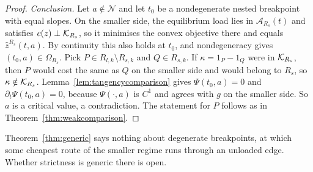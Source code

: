 \begin{proof}
\emph{Conclusion.} Let $a\notin\mathcal N$ and let $t_0$ be a nondegenerate nested breakpoint with equal slopes. On the smaller side, the equilibrium load lies in $\mathcal A_{R_s}(t)$ and satisfies $c(z)\perp\mathcal K_{R_s}$, so it minimises the convex objective there and equals $\hat z^{R_s}(t,a)$. By continuity this also holds at $t_0$, and nondegeneracy gives $(t_0,a)\in\Omega_{R_s}$. Pick $P\in R_{l,k}\setminus R_{s,k}$ and $Q\in R_{s,k}$. If $\kappa=1_P-1_Q$ were in $\mathcal K_{R_s}$, then $P$ would cost the same as $Q$ on the smaller side and would belong to $R_s$, so $\kappa\notin\mathcal K_{R_s}$. Lemma~\ref{lem:tangencycomparison} gives $\Psi(t_0,a)=0$ and $\partial_t\Psi(t_0,a)=0$, because $\Psi(\cdot,a)$ is $C^1$ and agrees with $g$ on the smaller side. So $a$ is a critical value, a contradiction. The statement for $P$ follows as in Theorem~\ref{thm:weakcomparison}.
\end{proof}

Theorem~\ref{thm:generic} says nothing about degenerate breakpoints, at which some cheapest route of the smaller regime runs through an unloaded edge. Whether strictness is generic there is open.
